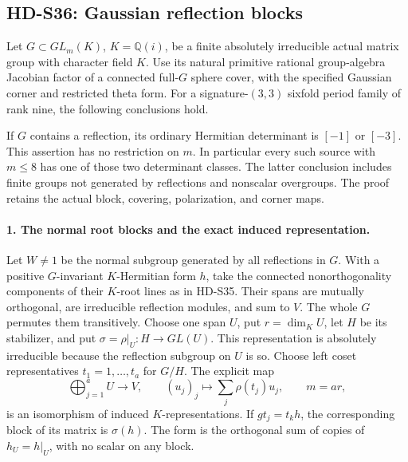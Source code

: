 \subsection{HD-S36: Gaussian reflection blocks}
\label{sec:gaussian-reflection-block-scope}

Let \(G\subset GL_m(K)\), \(K=\mathbb Q(i)\), be a finite
absolutely irreducible actual matrix group with character field \(K\).
Use its natural primitive rational group-algebra Jacobian factor of
a connected full-\(G\) sphere cover, with the specified Gaussian
corner and restricted theta form. For a signature-\((3,3)\) sixfold
period family of rank nine, the following conclusions hold.

If \(G\) contains a reflection, its ordinary Hermitian determinant
is \([-1]\) or \([-3]\). This assertion has no restriction on
\(m\). In particular every such source with \(m\le8\) has one
of those two determinant classes. The latter conclusion includes
finite groups not generated by reflections and nonscalar overgroups.
The proof retains the actual block, covering, polarization, and
corner maps.

\paragraph{1. The normal root blocks and the exact induced representation.}
Let \(W\ne1\) be the normal subgroup generated by all reflections
in \(G\). With a positive \(G\)-invariant \(K\)-Hermitian form
\(h\), take the connected nonorthogonality components of their
\(K\)-root lines as in HD-S35. Their spans are mutually orthogonal,
are irreducible reflection modules, and sum to \(V\). The whole
\(G\) permutes them transitively. Choose one span \(U\), put
\(r=\dim_KU\), let \(H\) be its stabilizer, and put
\(\sigma=\rho|_U:H\to GL(U)\). This representation is absolutely
irreducible because the reflection subgroup on \(U\) is so.
Choose left coset representatives \(t_1=1,\ldots,t_a\) for
\(G/H\). The explicit map
\[
 \bigoplus_{j=1}^aU\longrightarrow V,
 \qquad (u_j)_j\longmapsto\sum_j\rho(t_j)u_j,
 \qquad m=ar,                                                \tag{S36.1}
\]
is an isomorphism of induced \(K\)-representations. If
\(gt_j=t_kh\), the corresponding block of its matrix is
\(\sigma(h)\). The form is the orthogonal sum of copies of
\(h_U=h|_U\), with no scalar on any block.

